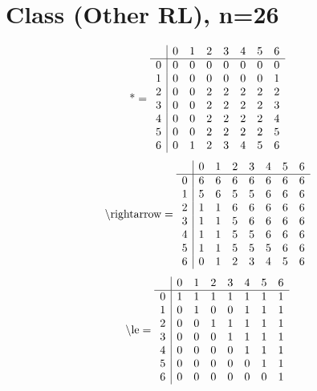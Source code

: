 \documentclass[11pt]{article}
\begin{document}
\section{Class (Other RL), n=26}
\[\text{*} = 
\begin{array}{r | r r r r r r r}
 & 0 & 1 & 2 & 3 & 4 & 5 & 6 \\ \hline
0 & 0 & 0 & 0 & 0 & 0 & 0 & 0 \\
1 & 0 & 0 & 0 & 0 & 0 & 0 & 1 \\
2 & 0 & 0 & 2 & 2 & 2 & 2 & 2 \\
3 & 0 & 0 & 2 & 2 & 2 & 2 & 3 \\
4 & 0 & 0 & 2 & 2 & 2 & 2 & 4 \\
5 & 0 & 0 & 2 & 2 & 2 & 2 & 5 \\
6 & 0 & 1 & 2 & 3 & 4 & 5 & 6 \\
\end{array}
\]
\[\text{\textbackslash rightarrow} = 
\begin{array}{r | r r r r r r r}
 & 0 & 1 & 2 & 3 & 4 & 5 & 6 \\ \hline
0 & 6 & 6 & 6 & 6 & 6 & 6 & 6 \\
1 & 5 & 6 & 5 & 5 & 6 & 6 & 6 \\
2 & 1 & 1 & 6 & 6 & 6 & 6 & 6 \\
3 & 1 & 1 & 5 & 6 & 6 & 6 & 6 \\
4 & 1 & 1 & 5 & 5 & 6 & 6 & 6 \\
5 & 1 & 1 & 5 & 5 & 5 & 6 & 6 \\
6 & 0 & 1 & 2 & 3 & 4 & 5 & 6 \\
\end{array}
\]
\[\text{\textbackslash le} = 
\begin{array}{r | r r r r r r r}
 & 0 & 1 & 2 & 3 & 4 & 5 & 6 \\ \hline
0 & 1 & 1 & 1 & 1 & 1 & 1 & 1 \\
1 & 0 & 1 & 0 & 0 & 1 & 1 & 1 \\
2 & 0 & 0 & 1 & 1 & 1 & 1 & 1 \\
3 & 0 & 0 & 0 & 1 & 1 & 1 & 1 \\
4 & 0 & 0 & 0 & 0 & 1 & 1 & 1 \\
5 & 0 & 0 & 0 & 0 & 0 & 1 & 1 \\
6 & 0 & 0 & 0 & 0 & 0 & 0 & 1 \\
\end{array}
\]
\end{document}
